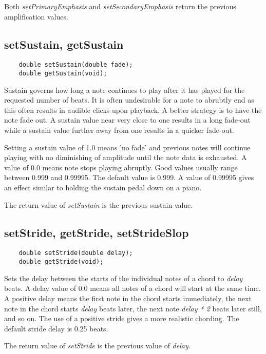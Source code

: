 \documentclass{article}
\begin{document}
Both
{\it setPrimaryEmphasis} and
{\it setSecondaryEmphasis}
return the previous amplification values.

\subsection*{setSustain, getSustain}

\begin{verbatim}
    double setSustain(double fade);
    double getSustain(void);
\end{verbatim}

Sustain governs how long a note continues to play after it has
played for the requested number of beats. It is often undesirable
for a note to abrubtly end as this often results in audible
clicks upon playback. A better strategy is to have the note
fade out. A sustain value near very close to one
results in a long fade-out while
a sustain value further away from one results in a quicker fade-out.

Setting a sustain value of 1.0 means 'no fade' and previous notes will continue
playing with no diminishing of amplitude until the note data is exhausted.
A value of 0.0 means 
note stops playing abruptly. Good values usually range
between 0.999 and 0.99995. The default value is 0.999. A value of 0.99995
gives an effect similar to holding the sustain pedal down on a piano.

The return value of {\it setSustain} is the previous sustain value.

\subsection*{setStride, getStride, setStrideSlop}

\begin{verbatim}
    double setStride(double delay);
    double getStride(void);
\end{verbatim}

Sets the delay between the starts of the individual notes of a chord to
{\it delay} beats. A delay value of 0.0 means all notes of a chord will
start at the same time. A positive delay means the first note in the chord
starts immediately, the next note in the chord starts {\it delay} beats
later, the next note {\it delay * 2} beats later still, and so on. The use
of a positive stride gives a more realistic chording. The default stride
delay is 0.25 beats.

The return value of {\it setStride} is the previous value of {\it delay}.
\end{document}
